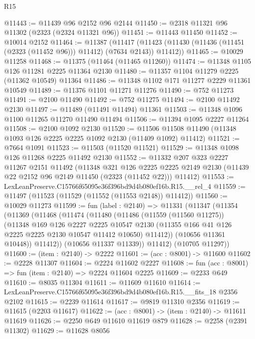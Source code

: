 \begin{lexlean}{R15}
\begin{coremodule}
@11443 := @11439 @96 @2152 @96 @2144
@11450 := @2318 @11321 @96 @11302 (@2323 (@2324 @11321 @96))
@11451 := @11443 @11450
@11452 := @10014 @2152
@11464 := @11387
    (@11417 (@11423 (@11430 (@11436 (@11451 (@2323 (@11452 @96))) @11412) (@7634 @2143)) @11412))
@11465 := @10029 @11258
@11468 := @11375 (@11464 (@11465 @11260))
@11474 := @11348 @1105 @126 @11281 @2225 @11364 @2130
@11480 := @11357 @1104 @11279 @2225 (@11362 @10549) @11364
@11486 := @11348 @1102 @171 @11277 @2229 @11361 @10549
@11489 := @11376 @1101 @11271 @11276
@11490 := @752 @11273
@11491 := @2100 @11490
@11492 := @752 @11275
@11494 := @2100 @11492 @2130
@11497 := @11489 (@11491 @11494) @11361
@11503 := @11348 @1096 @1100 @11265 @11270 @11490 @11494
@11506 := @11394 @1095 @2227 @11264
@11508 := @2100 @1092 @2130
@11520 := @11506 @11508 @11490 (@11348 @1093 @126 @2225 @2225 @1092 @2130 (@11409 @1092) @11412)
@11521 := @7664 @1091
@11523 := @11503 (@11520 @11521)
@11529 := @11348 @1098 @126 @11268 @2225 @11492 @2130
@11552 := @11332
    @207
    @323
    @2227
    @11267
    @2151
    @11492
    (@11348
      @321
      @126
      @2225
      @2225
      @2149
      @2130
      (@11439 @22 @2152 @96 @2149 @11450 (@2323 (@11452 @22)))
      @11412)
@11553 := LexLeanPreserve.C15766f65095e36f396bd9d4b080ef16b.R15.__rel_4
@11559 := @11497 (@11523 (@11529 (@11552 (@11553 @2148)) @11412))
@11560 := @10029 @11273
@11599 := fun (label : @2140) =>
  @11331
    (@11347
      (@11354
        (@11369
          (@11468
            (@11474
              (@11480
                (@11486
                  (@11559 (@11560 @11275))
                  (@11348
                    @169
                    @126
                    @2227
                    @2225
                    @10547
                    @2130
                    (@11355 @166 @41 @126 @2225 @2225 @2130 @10547 @11412 @10650)
                    @11412))
                (@10656 @11361 @10448))
              @11412))
          (@10656 @11337 @11339))
        @11412)
      (@10705 @11297))
@11600 := (item : @2140) -> @2222
@11601 := (acc : @8001) -> @11600
@11602 := @2228 @11307
@11604 := @2224 @11602 @2227
@11608 := fun (acc : @8001) => fun (item : @2140) => @2224 @11604 @2225
@11609 := @2233 @649
@11610 := @8035 @11304
@11611 := @11609 @11610
@11614 := LexLeanPreserve.C15766f65095e36f396bd9d4b080ef16b.R15.__fits_18 @2356 @2102
@11615 := @2239 @11614
@11617 := @9819 @11310 @2356
@11619 := @11615 (@2203 @11617)
@11622 := (acc : @8001) -> (item : @2140) -> @11611 @11619
@11626 := @2250 @649 @11610 @11619 @879
@11628 := @2258 (@2391 @11302)
@11629 := @11628 @8056

\end{coremodule}
\end{lexlean}
